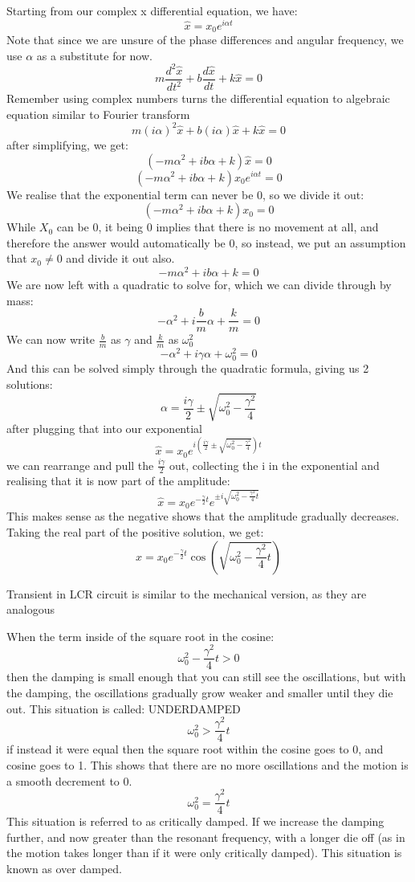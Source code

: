 \documentclass[10pt]{report}
\begin{document}
{{\par{Starting from our complex x differential equation, we have: \[
		\hat{x}=x_{0}e^{i\alpha t}
\] Note that since we are unsure of the phase differences and angular frequency, we use $\alpha$ as a substitute for now. \[
m\frac{d^{2}\hat{x}}{dt^{2}}+b\frac{d\hat{x}}{dt}+k\hat{x}=0
\] Remember using complex numbers turns the differential equation to algebraic equation similar to Fourier transform \[
m\left(i\alpha\right)^{2}\hat{x}+b\left(i\alpha\right)\hat{x}+k\hat{x}=0
\] after simplifying, we get: \[
\left( -m\alpha^{2}+ib\alpha+k\right)\hat{x}=0
\] \[
\left( -m\alpha^{2}+ib\alpha+k\right)x_{0}e^{i\alpha t}=0
\] We realise that the exponential term can never be 0, so we divide it out: \[
\left( -m\alpha^{2}+ib\alpha+k\right)x_{0}=0
\] While $X_{0}$ can be 0, it being 0 implies that there is no movement at all, and therefore the answer would automatically be 0, so instead, we put an assumption that $x_{0}\ne0$ and divide it out also. \[
-m\alpha^{2}+ib\alpha+k=0
\] We are now left with a quadratic to solve for, which we can divide through by mass: \[
-\alpha^{2}+i\frac{b}{m}\alpha+\frac{k}{m}=0
\] We can now write $\frac{b}{m}$ as $\gamma$ and $\frac{k}{m}$ as $\omega_{0}^{2}$ \[
-\alpha^{2}+i\gamma\alpha+\omega_{0}^{2}=0
\] And this can be solved simply through the quadratic formula, giving us 2 solutions: \[
\alpha=\frac{i\gamma}{2}\pm\sqrt{\omega_{0}^{2}-\frac{\gamma^{2}}{4}}
\] after plugging that into our exponential \[
\hat{x}=x_{0}e^{i\left(\frac{i\gamma}{2}\pm\sqrt{\omega_{0}^{2}-\frac{\gamma^{2}}{4}}
\right) t}
\] we can rearrange and pull the $\frac{i\gamma}{2}$ out, collecting the i in the exponential and realising that it is now part of the amplitude: \[
\hat{x}=x_{0}e^{-\frac{\gamma}{2}t}e^{\pm i\sqrt{\omega_{0}^{2}-\frac{\gamma^{2}}{4}t}}
\] This makes sense as the negative shows that the amplitude gradually decreases. Taking the real part of the positive solution, we get: \[
x=x_{0}e^{-\frac{\gamma}{2}t}\cos\left(\sqrt{\omega_{0}^{2}-\frac{\gamma^{2}}{4}t}\right)
\]}
\par{Transient in LCR circuit is similar to the mechanical version, as they are analogous

	When the term inside of the square root in the cosine: \[
	\omega_{0}^{2}-\frac{\gamma^{2}}{4}t>0
	\] then the damping is small enough that you can still see the oscillations, but with the damping, the oscillations gradually grow weaker and smaller until they die out. This situation is called: UNDERDAMPED \[
	\omega_{0}^{2}>\frac{\gamma^{2}}{4}t
	\] if instead it were equal then the square root within the cosine goes to 0, and cosine goes to 1. This shows that there are no more oscillations and the motion is a smooth decrement to 0. \[
	\omega_{0}^{2}=\frac{\gamma^{2}}{4}t
	\] This situation is referred to as critically damped. If we increase the damping further, and now greater than the resonant frequency, with a longer die off (as in the motion takes longer than if it were only critically damped). This situation is known as over damped.
}
}}
\end{document}
